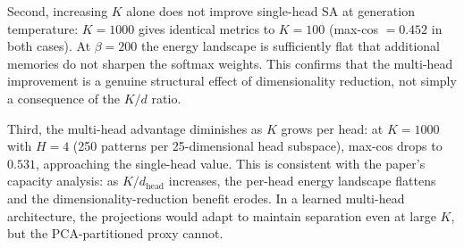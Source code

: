 Second, increasing $K$ alone does not improve single-head SA at generation temperature: $K{=}1000$ gives identical metrics to $K{=}100$ (max-cos $= 0.452$ in both cases). At $\beta{=}200$ the energy landscape is sufficiently flat that additional memories do not sharpen the softmax weights. This confirms that the multi-head improvement is a genuine structural effect of dimensionality reduction, not simply a consequence of the $K/d$ ratio.

Third, the multi-head advantage diminishes as $K$ grows per head: at $K{=}1000$ with $H{=}4$ (250 patterns per 25-dimensional head subspace), max-cos drops to $0.531$, approaching the single-head value. This is consistent with the paper's capacity analysis: as $K/d_{\mathrm{head}}$ increases, the per-head energy landscape flattens and the dimensionality-reduction benefit erodes. In a learned multi-head architecture, the projections would adapt to maintain separation even at large $K$, but the PCA-partitioned proxy cannot.
